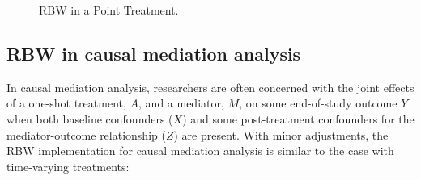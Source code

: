 \begin{figure} [ht]
\begin{center}
\end{center}
\caption{RBW in a Point Treatment.}
\label{fig:2}
\end{figure}

\hypertarget{rbw-mediation}{%
\subsection{RBW in causal mediation analysis}\label{rbw-mediation}}

In causal mediation analysis, researchers are often concerned with the
joint effects of a one-shot treatment, \(A\), and a mediator, \(M\), on
some end-of-study outcome \(Y\) when both baseline confounders (\(X\))
and some post-treatment confounders for the mediator-outcome
relationship (\(Z\)) are present. With minor adjustments, the RBW
implementation for causal mediation analysis is similar to the case with
time-varying treatments:


